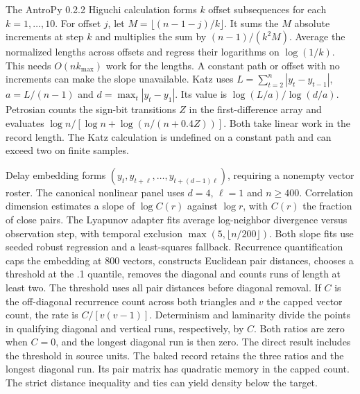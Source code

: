 The AntroPy 0.2.2 Higuchi calculation forms $k$ offset subsequences
for each $k=1,\ldots,10$. For offset $j$, let
$M=\lfloor(n-1-j)/k\rfloor$. It sums the $M$ absolute increments
at step $k$ and multiplies the sum by $(n-1)/(k^2M)$. Average the
normalized lengths across offsets and regress their logarithms on
$\log(1/k)$. This needs $O(nk_{\max})$ work for the lengths. A
constant path or offset with no increments can make the slope
unavailable. Katz uses $L=\sum_{t=2}^n|y_t-y_{t-1}|$,
$a=L/(n-1)$ and $d=\max_t|y_t-y_1|$. Its value is
$\log(L/a)/\log(d/a)$. Petrosian counts the sign-bit transitions
$Z$ in the first-difference array and evaluates
$\log n/[\log n+\log(n/(n+0.4Z))]$. Both take linear work in
the record length. The Katz calculation is undefined on a constant
path and can exceed two on finite samples.

Delay embedding forms $(y_t,y_{t+\ell},\ldots,y_{t+(d-1)\ell})$, requiring a nonempty vector roster. The canonical nonlinear panel uses $d=4$, $\ell=1$ and $n\ge400$. Correlation dimension estimates a slope of $\log C(r)$ against $\log r$, with $C(r)$ the fraction of close pairs. The Lyapunov adapter fits average log-neighbor divergence versus observation step, with temporal exclusion $\max(5,\lfloor n/200\rfloor)$. Both slope fits use seeded robust regression and a least-squares fallback. Recurrence quantification caps the embedding at 800 vectors, constructs Euclidean pair distances, chooses a threshold at the .1 quantile, removes the diagonal and counts runs of length at least two. The threshold uses all pair distances before diagonal removal. If $C$ is the off-diagonal recurrence count across both triangles and $v$ the capped vector count, the rate is $C/[v(v-1)]$. Determinism and laminarity divide the points in qualifying diagonal and vertical runs, respectively, by $C$. Both ratios are zero when $C=0$, and the longest diagonal run is then zero. The direct result includes the threshold in source units. The baked record retains the three ratios and the longest diagonal run. Its pair matrix has quadratic memory in the capped count. The strict distance inequality and ties can yield density below the target.

